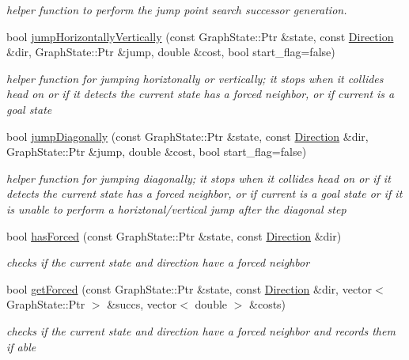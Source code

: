 \begin{DoxyCompactItemize}
\begin{DoxyCompactList}\small\item\em helper function to perform the jump point search successor generation. \end{DoxyCompactList}\item 
bool \hyperlink{class_graph_a76d3007090b5905c23537c81e9e024d6}{jump\-Horizontally\-Vertically} (const \-Graph\-State\-::\-Ptr \&state, const \hyperlink{class_direction}{\-Direction} \&dir, \-Graph\-State\-::\-Ptr \&jump, double \&cost, bool start\-\_\-flag=false)
\begin{DoxyCompactList}\small\item\em helper function for jumping horiztonally or vertically; it stops when it collides head on or if it detects the current state has a forced neighbor, or if current is a goal state \end{DoxyCompactList}\item 
bool \hyperlink{class_graph_af21e26671325b794fda4b55ed5b576a1}{jump\-Diagonally} (const \-Graph\-State\-::\-Ptr \&state, const \hyperlink{class_direction}{\-Direction} \&dir, \-Graph\-State\-::\-Ptr \&jump, double \&cost, bool start\-\_\-flag=false)
\begin{DoxyCompactList}\small\item\em helper function for jumping diagonally; it stops when it collides head on or if it detects the current state has a forced neighbor, or if current is a goal state or if it is unable to perform a horiztonal/vertical jump after the diagonal step \end{DoxyCompactList}\item 
bool \hyperlink{class_graph_a9441ead74678874ba7eb491b01d23351}{has\-Forced} (const \-Graph\-State\-::\-Ptr \&state, const \hyperlink{class_direction}{\-Direction} \&dir)
\begin{DoxyCompactList}\small\item\em checks if the current state and direction have a forced neighbor \end{DoxyCompactList}\item 
bool \hyperlink{class_graph_a978e25f8bf2e9fb8760d527b74bbc285}{get\-Forced} (const \-Graph\-State\-::\-Ptr \&state, const \hyperlink{class_direction}{\-Direction} \&dir, vector$<$ \-Graph\-State\-::\-Ptr $>$ \&succs, vector$<$ double $>$ \&costs)
\begin{DoxyCompactList}\small\item\em checks if the current state and direction have a forced neighbor and records them if able \end{DoxyCompactList}\item 

\end{DoxyCompactItemize}
